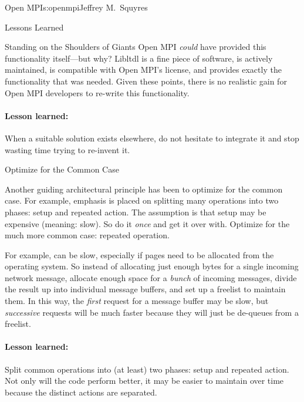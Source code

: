 \begin{aosachapter}{Open MPI}{s:openmpi}{Jeffrey M.\ Squyres}
\begin{aosasect1}{Lessons Learned}
\begin{aosasect2}{Standing on the Shoulders of Giants}
Open MPI \emph{could} have provided this functionality itself---but
why?
%
Libltdl is a fine piece of software, is actively maintained, is
compatible with Open MPI's license, and provides exactly the
functionality that was needed.
%
Given these points, there is no realistic gain for Open MPI developers
to re-write this functionality.


\paragraph{Lesson learned:} 

When a suitable solution exists elsewhere, do not hesitate to integrate
it and stop wasting time trying to re-invent it.

\end{aosasect2}


\begin{aosasect2}{Optimize for the Common Case}

Another guiding architectural principle has been to optimize for the
common case.  
% 
For example, emphasis is placed on splitting many operations into two
phases: setup and repeated action.  The assumption is that setup may
be expensive (meaning: slow).  So do it \emph{once} and get it over
with.
%
Optimize for the much more common case: repeated operation.

For example,  can be slow, especially if pages need to
be allocated from the operating system.  So instead of allocating just
enough bytes for a single incoming network message, allocate enough
space for a \emph{bunch} of incoming messages, divide the result up
into individual message buffers, and set up a freelist to maintain
them.  In this way, the \emph{first} request for a message buffer may
be slow, but \emph{successive} requests will be much faster because
they will just be de-queues from a freelist.


\paragraph{Lesson learned:} Split common operations into (at least)
two phases: setup and repeated action.  Not only will the code perform
better, it may be easier to maintain over time because the distinct
actions are separated.


\end{aosasect2}
\end{aosasect1}
\end{aosachapter}
